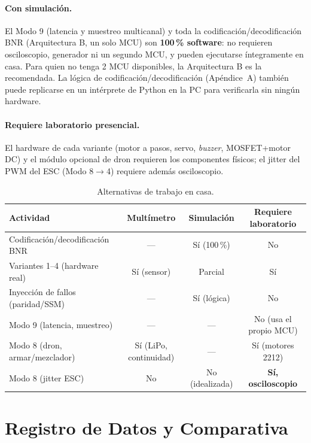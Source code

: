 \documentclass[11pt]{article}
\begin{document}
\paragraph{Con simulación.} El Modo 9 (latencia y muestreo multicanal) y toda la
codificación/decodificación BNR (Arquitectura B, un solo MCU) son \textbf{100\,\%
software}: no requieren osciloscopio, generador ni un segundo MCU, y pueden ejecutarse
íntegramente en casa. Para quien no tenga 2 MCU disponibles, la Arquitectura B es la
recomendada. La lógica de codificación/decodificación (Apéndice~A) también puede
replicarse en un intérprete de Python en la PC para verificarla sin ningún hardware.

\paragraph{Requiere laboratorio presencial.} El hardware de cada variante (motor a
pasos, servo, \emph{buzzer}, MOSFET+motor DC) y el módulo opcional de dron requieren los
componentes físicos; el jitter del PWM del ESC (Modo 8$\to$4) requiere además
osciloscopio.

\begin{table}[H]\centering
\caption{Alternativas de trabajo en casa.}
\begin{tabular}{lccc}
\toprule
Actividad & Multímetro & Simulación & Requiere laboratorio \\
\midrule
Codificación/decodificación BNR & --- & Sí (100\,\%) & No \\
Variantes 1--4 (hardware real) & Sí (sensor) & Parcial & Sí \\
Inyección de fallos (paridad/SSM) & --- & Sí (lógica) & No \\
Modo 9 (latencia, muestreo) & --- & --- & No (usa el propio MCU) \\
Modo 8 (dron, armar/mezclador) & Sí (LiPo, continuidad) & --- & Sí (motores 2212) \\
Modo 8 (jitter ESC) & No & No (idealizada) & \textbf{Sí, osciloscopio} \\
\bottomrule
\end{tabular}
\end{table}

\section{Registro de Datos y Comparativa}
\end{document}
